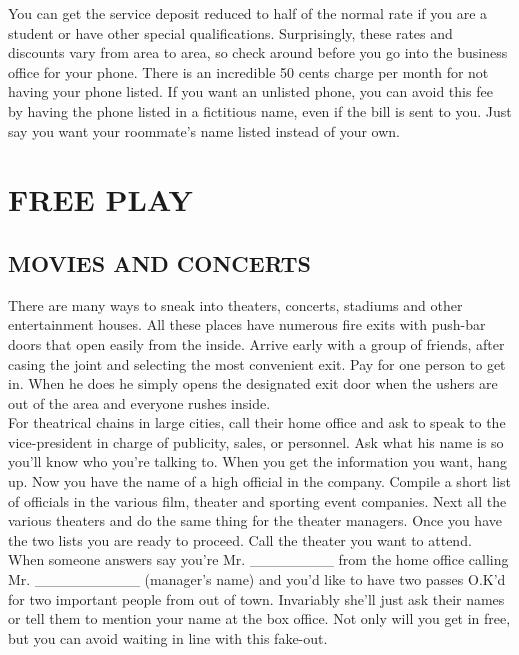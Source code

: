 \documentclass[11pt,twoside,a4paper]{book}
\begin{document}
You can get the service deposit reduced to half of the normal rate if you are a student or have other special qualifications. Surprisingly, these rates and discounts vary from area to area, so check around before you go into the business office for your phone. There is an incredible 50 cents charge per month for not having your phone listed. If you want an unlisted phone, you can avoid this fee by having the phone listed in a fictitious name, even if the bill is sent to you. Just say you want your roommate's name listed instead of your own. 

\section{FREE PLAY}

\subsection{MOVIES AND CONCERTS}

There are many ways to sneak into theaters, concerts, stadiums and other entertainment houses. All these places have numerous fire exits with push-bar doors that open easily from the inside. Arrive early with a group of friends, after casing the joint and selecting the most convenient exit. Pay for one person to get in. When he does he simply opens the designated exit door when the ushers are out of the area and everyone rushes inside.~\\

For theatrical chains in large cities, call their home office and ask to speak to the vice-president in charge of publicity, sales, or personnel. Ask what his name is so you'll know who you're talking to. When you get the information you want, hang up. Now you have the name of a high official in the company. Compile a short list of officials in the various film, theater and sporting event companies. Next all the various theaters and do the same thing for the theater managers. Once you have the two lists you are ready to proceed. Call the theater you want to attend. When someone answers say you're Mr. \_\_\_\_\_\_\_\_ from the home office calling Mr. \_\_\_\_\_\_\_\_\_\_ (manager's name) and you'd like to have two passes O.K'd for two important people from out of town. Invariably she'll just ask their names or tell them to mention your name at the box office. Not only will you get in free, but you can avoid waiting in line with this fake-out.~\\
\end{document}
